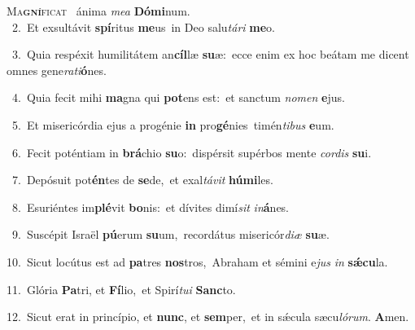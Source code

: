 \lettrine{\initial\textcolor{\initialcolor}{M}}{a\-\textbf{gní}\-ficat~\star} ánima \textit{me}\-\textit{a} \textbf{Dó}\-\textbf{mi}num.\\
{\numbfont\textcolor{\numbcolor}{~2.}}~Et exsultávit \textbf{spí}\-ritus \textbf{me}\-us~\star in Deo salu\-\textit{tá}\-\textit{ri} \textbf{me}\-o.\par
{\numbfont\textcolor{\numbcolor}{~3.}}~Quia respéxit humilitátem an\-\textbf{cíl}\-læ \textbf{su}\-æ:~\star ecce enim ex hoc beátam me dicent omnes gene\-\textit{ra}\-\textit{ti}\textbf{ó}nes.\par
{\numbfont\textcolor{\numbcolor}{~4.}}~Quia fecit mihi \textbf{ma}\-gna qui \textbf{pot}\-ens est:~\star et sanctum \textit{no}\-\textit{men} \textbf{e}\-jus.\par
{\numbfont\textcolor{\numbcolor}{~5.}}~Et misericórdia ejus a progénie \textbf{in} pro\-\textbf{gé}\-nies~\star timén\-\textit{ti}\-\textit{bus} \textbf{e}\-um.\par
{\numbfont\textcolor{\numbcolor}{~6.}}~Fecit poténtiam in \textbf{brá}\-chio \textbf{su}\-o:~\star dispérsit supérbos mente \textit{cor}\-\textit{dis} \textbf{su}\-i.\par
{\numbfont\textcolor{\numbcolor}{~7.}}~Depósuit pot\-\textbf{én}\-tes de \textbf{se}\-de,~\star et exal\-\textit{tá}\-\textit{vit} \textbf{hú}\-\textbf{mi}les.\par
{\numbfont\textcolor{\numbcolor}{~8.}}~Esuriéntes im\-\textbf{plé}\-vit \textbf{bo}\-nis:~\star et dívites dimí\textit{sit} \textit{in}\-\textbf{á}nes.\par
{\numbfont\textcolor{\numbcolor}{~9.}}~Suscépit Israël \textbf{pú}\-erum \textbf{su}\-um,~\star recordátus misericór\-\textit{di}\-\textit{æ} \textbf{su}\-æ.\par
{\numbfont\textcolor{\numbcolor}{10.}}~Sicut locútus est ad \textbf{pa}\-tres \textbf{nos}\-tros,~\star Abraham et sémini e\textit{jus} \textit{in} \textbf{sǽ}\-\textbf{cu}la.\par
{\numbfont\textcolor{\numbcolor}{11.}}~Glória \textbf{Pa}\-tri, et \textbf{Fí}\-lio,~\star et Spirí\-\textit{tu}\-\textit{i} \textbf{Sanc}\-to.\par
{\numbfont\textcolor{\numbcolor}{12.}}~Sicut erat in princípio, et \textbf{nunc}\-, et \textbf{sem}\-per,~\star et in sǽcula sæcu\-\textit{ló}\-\textit{rum}. \textbf{A}\-men.\par

